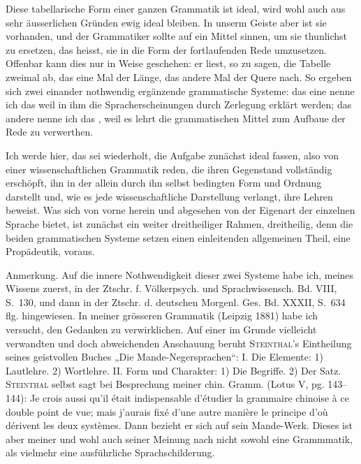 Diese tabellarische Form einer ganzen Grammatik ist ideal, wird wohl auch aus sehr äusserlichen Gründen ewig ideal bleiben. In unserm Geiste aber ist sie vorhanden, und der Grammatiker sollte auf ein Mittel sinnen, um sie thunlichst zu ersetzen, das heisst, sie in die Form der fortlaufenden Rede umzusetzen. Offenbar kann dies nur in  Weise geschehen: er liest, so zu sagen, die Tabelle zweimal ab, das eine Mal der Länge, das andere Mal der Quere nach. So ergeben sich zwei einander nothwendig ergänzende grammatische Systeme: das eine nenne ich das  weil in ihm die Spracherscheinungen durch Zerlegung erklärt werden; das andere nenne ich das , weil es lehrt die grammatischen Mittel zum Aufbaue der Rede zu verwerthen.
\largerpage

\label{sp.86}

Ich werde hier, das sei wiederholt, die Aufgabe zunächst ideal fassen, also von einer wissenschaftlichen Grammatik reden, die ihren Gegenstand vollständig erschöpft, ihn in der allein durch ihn selbst bedingten Form und Ordnung darstellt und, wie es jede wissenschaftliche Darstellung verlangt, ihre Lehren beweist. Was sich von vorne herein und abgesehen von der Eigenart der einzelnen Sprache bietet, ist zunächst ein weiter dreitheiliger Rahmen, dreitheilig, denn die beiden grammatischen Systeme setzen einen einleitenden allgemeinen Theil, eine Propädeutik, voraus.

\begin{styleAnmerk}
Anmerkung. Auf die innere Nothwendigkeit dieser zwei Systeme habe ich, meines Wissens zuerst, in der Ztschr. f. Völkerpsych. und Sprachwissensch. Bd. VIII, S.~130, und dann in der Ztschr. d. deutschen Morgenl. Ges. Bd. XXXII, S.~634 flg. hingewiesen. In meiner grösseren  Grammatik (Leipzig 1881) habe ich versucht, den Gedanken zu verwirklichen. Auf einer im Grunde vielleicht verwandten und doch abweichenden Anschauung beruht \textsc{Steinthal}’s Eintheilung seines geistvollen Buches „Die Mande-Negersprachen“: I. Die Elemente: 1) Lautlehre. 2) Wortlehre. II. Form und Charakter: 1) Die Begriffe. 2) Der Satz. \textsc{Steinthal} \label{fp.88} selbst sagt bei Besprechung meiner chin. Gramm. (Lotus V, pg. 143–144): Je crois aussi qu’il était indispensable d’étudier la grammaire chinoise à ce double point de vue; mais j’aurais fixé d’une autre manière le principe d’où dérivent les deux systèmes. Dann bezieht er sich auf sein Mande-Werk. Dieses ist aber meiner und wohl auch seiner Meinung nach nicht sowohl eine Grammmatik, als vielmehr eine ausführliche Sprachschilderung.
\end{styleAnmerk}

